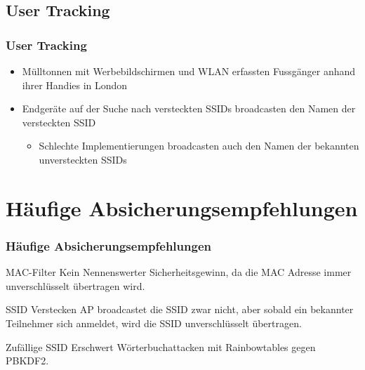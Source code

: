 \documentclass{beamer}
\begin{document}
\subsection{User Tracking}
\begin{frame}
\frametitle{User Tracking}
\begin{itemize}
	\item Mülltonnen mit Werbebildschirmen und WLAN erfassten Fussgänger anhand ihrer Handies in London \cite{mulltonnen}
	\vspace{1,5cm}
	\item Endgeräte auf der Suche nach versteckten SSIDs broadcasten den Namen der versteckten SSID
	\begin{itemize}
		\item Schlechte Implementierungen broadcasten auch den Namen der bekannten unversteckten SSIDs
	\end{itemize}
\end{itemize}
\end{frame}

\section{Häufige Absicherungsempfehlungen}
\begin{frame}
\frametitle{Häufige Absicherungsempfehlungen}
\begin{block}{MAC-Filter}
Kein Nennenswerter Sicherheitsgewinn, da die MAC Adresse immer unverschlüsselt übertragen wird.
\end{block}
\begin{block}{SSID Verstecken}
AP broadcastet die SSID zwar nicht, aber sobald ein bekannter Teilnehmer sich anmeldet, wird die SSID unverschlüsselt übertragen.
\end{block} 
\begin{block}{Zufällige SSID}
Erschwert Wörterbuchattacken mit Rainbowtables gegen PBKDF2.
\end{block}
\end{frame}
\end{document}
